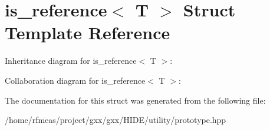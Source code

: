 \hypertarget{structis__reference}{}\section{is\+\_\+reference$<$ T $>$ Struct Template Reference}
\label{structis__reference}


Inheritance diagram for is\+\_\+reference$<$ T $>$\+:


Collaboration diagram for is\+\_\+reference$<$ T $>$\+:


The documentation for this struct was generated from the following file\+:\begin{DoxyCompactItemize}
\item 
/home/rfmeas/project/gxx/gxx/\+H\+I\+D\+E/utility/prototype.\+hpp\end{DoxyCompactItemize}
